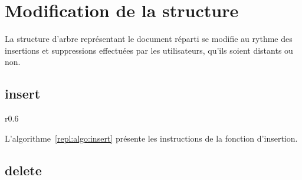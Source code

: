 
\section{Modification de la structure}

La structure d'arbre représentant le document réparti se modifie au rythme des
insertions et suppressions effectuées par les utilisateurs, qu'ils soient
distants ou non. 

\subsection{insert}


\begin{wrapfigure}{r}{0.6\textwidth}
  \vspace{-35pt} %
  \begin{minipage}[t]{0.6\textwidth}
    \begin{algorithm}[H]
      
      \caption{\label{repl:algo:insert} Insert.}
    \end{algorithm}
  \end{minipage}
  \vspace{-15pt}
\end{wrapfigure}

L'algorithme~\ref{repl:algo:insert} présente les instructions de la fonction
d'insertion.


\subsection{delete}